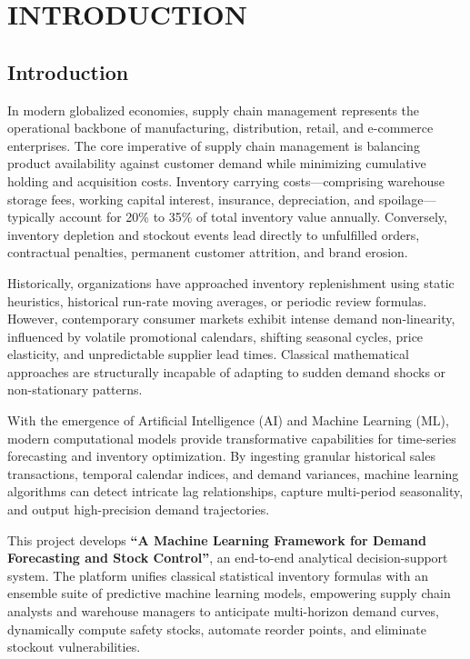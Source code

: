 \documentclass[12pt,a4paper]{report}
\begin{document}
\newpage
\tableofcontents

\newpage
{}
\setcounter{page}{1}

\chapter{INTRODUCTION}

\section{Introduction}
In modern globalized economies, supply chain management represents the operational backbone of manufacturing, distribution, retail, and e-commerce enterprises. The core imperative of supply chain management is balancing product availability against customer demand while minimizing cumulative holding and acquisition costs. Inventory carrying costs---comprising warehouse storage fees, working capital interest, insurance, depreciation, and spoilage---typically account for 20\% to 35\% of total inventory value annually. Conversely, inventory depletion and stockout events lead directly to unfulfilled orders, contractual penalties, permanent customer attrition, and brand erosion.

Historically, organizations have approached inventory replenishment using static heuristics, historical run-rate moving averages, or periodic review formulas. However, contemporary consumer markets exhibit intense demand non-linearity, influenced by volatile promotional calendars, shifting seasonal cycles, price elasticity, and unpredictable supplier lead times. Classical mathematical approaches are structurally incapable of adapting to sudden demand shocks or non-stationary patterns.

With the emergence of Artificial Intelligence (AI) and Machine Learning (ML), modern computational models provide transformative capabilities for time-series forecasting and inventory optimization. By ingesting granular historical sales transactions, temporal calendar indices, and demand variances, machine learning algorithms can detect intricate lag relationships, capture multi-period seasonality, and output high-precision demand trajectories.

This project develops \textbf{``A Machine Learning Framework for Demand Forecasting and Stock Control''}, an end-to-end analytical decision-support system. The platform unifies classical statistical inventory formulas with an ensemble suite of predictive machine learning models, empowering supply chain analysts and warehouse managers to anticipate multi-horizon demand curves, dynamically compute safety stocks, automate reorder points, and eliminate stockout vulnerabilities.
\end{document}
